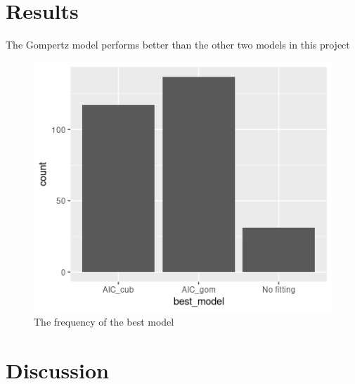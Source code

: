\documentclass[11pt, a4paper]{article}
\begin{document}
\section{Results}
The Gompertz model performs better than the other two models in this project
\begin{figure}[H]\centering
  \includegraphics[width=1\textwidth]{best_model_AIC.png}
  \caption{\label{foto1}The frequency of the best model}
  \end{figure}

\section{Discussion}

  

 
  


\end{document}
